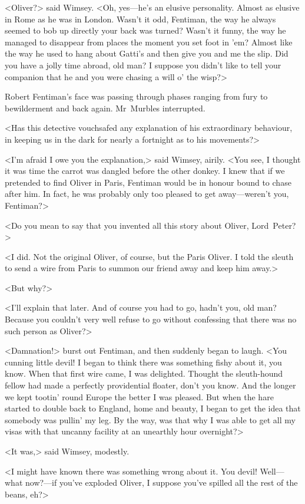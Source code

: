 <Oliver?> said Wimsey. <Oh, yes—he's an elusive personality. Almost as elusive in Rome as he was in London. Wasn't it odd, Fentiman, the way he always seemed to bob up directly your back was turned? Wasn't it funny, the way he managed to disappear from places the moment you set foot in 'em? Almost like the way he used to hang about Gatti's and then give you and me the slip. Did you have a jolly time abroad, old man? I suppose you didn't like to tell your companion that he and you were chasing a will o' the wisp?>

Robert Fentiman's face was passing through phases ranging from fury to bewilderment and back again. Mr~Murbles interrupted.

<Has this detective vouchsafed any explanation of his extraordinary behaviour, in keeping us in the dark for nearly a fortnight as to his movements?>

<I'm afraid I owe you the explanation,> said Wimsey, airily. <You see, I thought it was time the carrot was dangled before the other donkey. I knew that if we pretended to find Oliver in Paris, Fentiman would be in honour bound to chase after him. In fact, he was probably only too pleased to get away—weren't you, Fentiman?>

<Do you mean to say that you invented all this story about Oliver, Lord~Peter?>

<I did. Not the original Oliver, of course, but the Paris Oliver. I told the sleuth to send a wire from Paris to summon our friend away and keep him away.>

<But why?>

<I'll explain that later. And of course you had to go, hadn't you, old man? Because you couldn't very well refuse to go without confessing that there was no such person as Oliver?>

<Damnation!> burst out Fentiman, and then suddenly began to laugh. <You cunning little devil! I began to think there was something fishy about it, you know. When that first wire came, I was delighted. Thought the sleuth-hound fellow had made a perfectly providential floater, don't you know. And the longer we kept tootin' round Europe the better I was pleased. But when the hare started to double back to England, home and beauty, I began to get the idea that somebody was pullin' my leg. By the way, was that why I was able to get all my visas with that uncanny facility at an unearthly hour overnight?>

<It was,> said Wimsey, modestly.

<I might have known there was something wrong about it. You devil! Well—what now?—if you've exploded Oliver, I suppose you've spilled all the rest of the beans, eh?>

